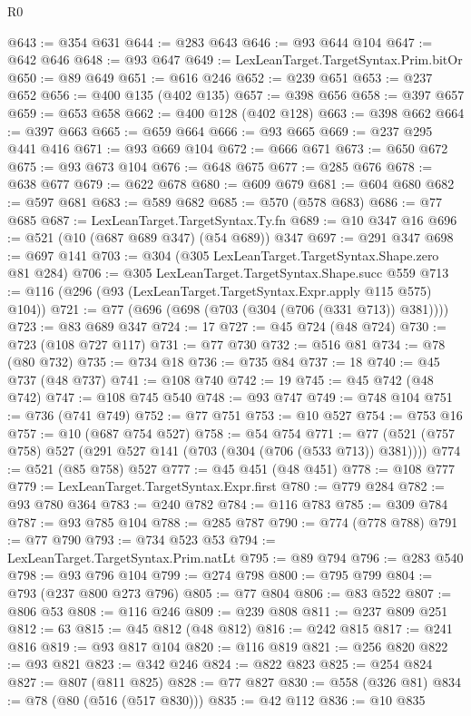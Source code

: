 \begin{lexlean}{R0}
\begin{coremodule}
@643 := @354 @631
@644 := @283 @643
@646 := @93 @644 @104
@647 := @642 @646
@648 := @93 @647
@649 := LexLeanTarget.TargetSyntax.Prim.bitOr
@650 := @89 @649
@651 := @616 @246
@652 := @239 @651
@653 := @237 @652
@656 := @400 @135 (@402 @135)
@657 := @398 @656
@658 := @397 @657
@659 := @653 @658
@662 := @400 @128 (@402 @128)
@663 := @398 @662
@664 := @397 @663
@665 := @659 @664
@666 := @93 @665
@669 := @237 @295 @441 @416
@671 := @93 @669 @104
@672 := @666 @671
@673 := @650 @672
@675 := @93 @673 @104
@676 := @648 @675
@677 := @285 @676
@678 := @638 @677
@679 := @622 @678
@680 := @609 @679
@681 := @604 @680
@682 := @597 @681
@683 := @589 @682
@685 := @570 (@578 @683)
@686 := @77 @685
@687 := LexLeanTarget.TargetSyntax.Ty.fn
@689 := @10 @347 @16
@696 := @521 (@10 (@687 @689 @347) (@54 @689)) @347
@697 := @291 @347
@698 := @697 @141
@703 := @304 (@305 LexLeanTarget.TargetSyntax.Shape.zero @81 @284)
@706 := @305 LexLeanTarget.TargetSyntax.Shape.succ @559
@713 := @116 (@296 (@93 (LexLeanTarget.TargetSyntax.Expr.apply @115 @575) @104))
@721 := @77 (@696 (@698 (@703 (@304 (@706 (@331 @713)) @381))))
@723 := @83 @689 @347
@724 := 17
@727 := @45 @724 (@48 @724)
@730 := @723 (@108 @727 @117)
@731 := @77 @730
@732 := @516 @81
@734 := @78 (@80 @732)
@735 := @734 @18
@736 := @735 @84
@737 := 18
@740 := @45 @737 (@48 @737)
@741 := @108 @740
@742 := 19
@745 := @45 @742 (@48 @742)
@747 := @108 @745 @540
@748 := @93 @747
@749 := @748 @104
@751 := @736 (@741 @749)
@752 := @77 @751
@753 := @10 @527
@754 := @753 @16
@757 := @10 (@687 @754 @527)
@758 := @54 @754
@771 := @77 (@521 (@757 @758) @527 (@291 @527 @141 (@703 (@304 (@706 (@533 @713)) @381))))
@774 := @521 (@85 @758) @527
@777 := @45 @451 (@48 @451)
@778 := @108 @777
@779 := LexLeanTarget.TargetSyntax.Expr.first
@780 := @779 @284
@782 := @93 @780 @364
@783 := @240 @782
@784 := @116 @783
@785 := @309 @784
@787 := @93 @785 @104
@788 := @285 @787
@790 := @774 (@778 @788)
@791 := @77 @790
@793 := @734 @523 @53
@794 := LexLeanTarget.TargetSyntax.Prim.natLt
@795 := @89 @794
@796 := @283 @540
@798 := @93 @796 @104
@799 := @274 @798
@800 := @795 @799
@804 := @793 (@237 @800 @273 @796)
@805 := @77 @804
@806 := @83 @522
@807 := @806 @53
@808 := @116 @246
@809 := @239 @808
@811 := @237 @809 @251
@812 := 63
@815 := @45 @812 (@48 @812)
@816 := @242 @815
@817 := @241 @816
@819 := @93 @817 @104
@820 := @116 @819
@821 := @256 @820
@822 := @93 @821
@823 := @342 @246
@824 := @822 @823
@825 := @254 @824
@827 := @807 (@811 @825)
@828 := @77 @827
@830 := @558 (@326 @81)
@834 := @78 (@80 (@516 (@517 @830)))
@835 := @42 @112
@836 := @10 @835

\end{coremodule}
\end{lexlean}
